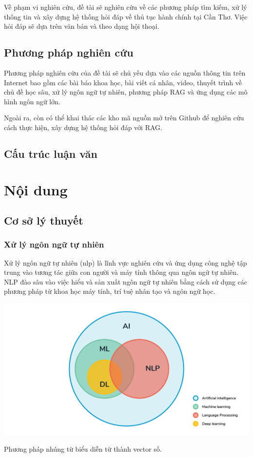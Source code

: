 \documentclass[a4paper, 12pt, openany]{book}
\begin{document}
Về phạm vi nghiên cứu, đề tài sẽ nghiên cứu về các phương pháp tìm kiếm, xử lý thông tin và
xây dựng hệ thống hỏi đáp về thủ tục hành chính tại Cần Thơ. Việc hỏi đáp sẽ dựa trên văn bản 
và theo dạng hội thoại.

\section{Phương pháp nghiên cứu}

Phương pháp nghiên cứu của đề tài sẽ chủ yếu dựa vào các nguồn thông tin trên Internet bao gồm các bài báo khoa học,
bài viết cá nhân, video, thuyết trình về chủ đề học sâu, xử lý ngôn ngữ tự nhiên, phương pháp RAG và ứng dụng các mô hình ngôn ngữ lớn.

Ngoài ra, còn có thể khai thác các kho mã nguồn mở trên Github để nghiên cứu cách thực hiện, xây dựng hệ thống hỏi đáp với RAG.

\section{Cấu trúc luận văn}


\chapter{Nội dung}

\section{Cơ sở lý thuyết}
\subsection{Xử lý ngôn ngữ tự nhiên}
Xử lý ngôn ngữ tự nhiên (\ac{nlp}) là lĩnh vực nghiên cứu và ứng dụng công nghệ tập trung vào tương tác giữa con người và máy tính thông qua ngôn ngữ tự nhiên. NLP đào sâu vào việc hiểu và sản xuất ngôn ngữ tự nhiên bằng cách sử dụng các phương pháp từ khoa học máy tính, trí tuệ nhân tạo và ngôn ngữ học.

\vspace{0.5cm}
\begin{minipage}{\linewidth}
    \captionsetup{type=figure}
    \centering
    \includegraphics[width=\linewidth]{./assets/images/nln.png}
    \caption{Phương pháp nhúng từ biểu diễn từ thành vector số.}
\end{minipage}
\vspace{0.5cm}
\end{document}
